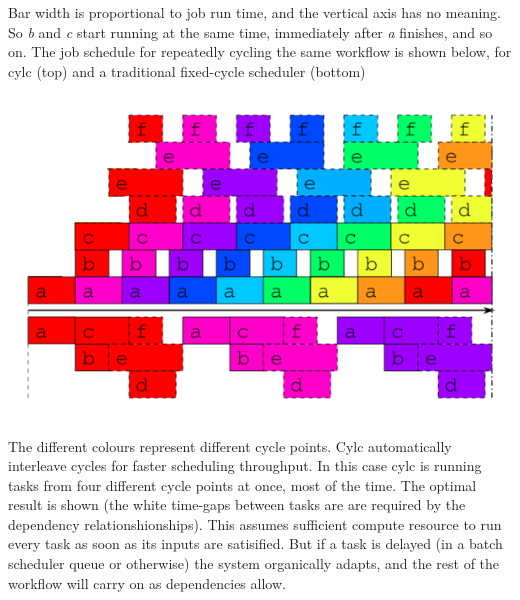 Bar width is proportional to job run time, and the vertical axis has no
meaning.  So {\em b} and {\em c} start running at the same time,
immediately after {\em a} finishes, and so on.  The job schedule for repeatedly
cycling the same workflow is shown below, for cylc (top) and a traditional
fixed-cycle scheduler (bottom) 

\begin{center}
    \includegraphics[width=0.5\columnwidth]{resources/tex/timeline-two}
\end{center}

The different colours represent different cycle points.  Cylc automatically
interleave cycles for faster scheduling throughput. In this case cylc is
running tasks from four different cycle points at once, most of the time. The
optimal result is shown (the white time-gaps between tasks are are required by
the dependency relationshionships). This assumes sufficient compute resource to
run every task as soon as its inputs are satisified. But if a task is delayed
(in a batch scheduler queue or otherwise) the system organically adapts, and
the rest of the workflow will carry on as dependencies allow.
